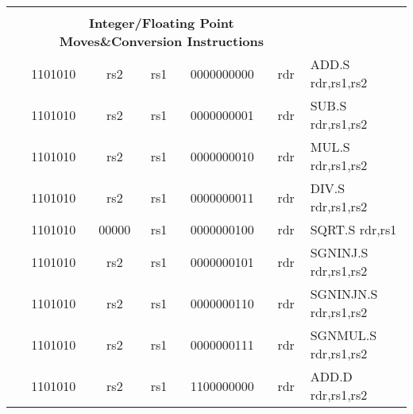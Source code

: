 \begin{table}[p]
\begin{small}
\begin{center}
\begin{tabular}{rcccccccccl}
&
\multicolumn{9}{c}{} & \\
&
\multicolumn{9}{c}{\bf Integer/Floating Point Moves\&Conversion Instructions} & \\
\cline{2-10}
  

&
\multicolumn{2}{|c|}{1101010} &
\multicolumn{1}{c|}{rs2} &
\multicolumn{1}{c|}{rs1} &
\multicolumn{4}{c|}{0000000000} &
\multicolumn{1}{c|}{rdr} & ADD.S rdr,rs1,rs2 \\
\cline{2-10}
  

&
\multicolumn{2}{|c|}{1101010} &
\multicolumn{1}{c|}{rs2} &
\multicolumn{1}{c|}{rs1} &
\multicolumn{4}{c|}{0000000001} &
\multicolumn{1}{c|}{rdr} & SUB.S rdr,rs1,rs2 \\
\cline{2-10}
  

&
\multicolumn{2}{|c|}{1101010} &
\multicolumn{1}{c|}{rs2} &
\multicolumn{1}{c|}{rs1} &
\multicolumn{4}{c|}{0000000010} &
\multicolumn{1}{c|}{rdr} & MUL.S rdr,rs1,rs2 \\
\cline{2-10}
  

&
\multicolumn{2}{|c|}{1101010} &
\multicolumn{1}{c|}{rs2} &
\multicolumn{1}{c|}{rs1} &
\multicolumn{4}{c|}{0000000011} &
\multicolumn{1}{c|}{rdr} & DIV.S rdr,rs1,rs2 \\
\cline{2-10}
  

&
\multicolumn{2}{|c|}{1101010} &
\multicolumn{1}{c|}{00000} &
\multicolumn{1}{c|}{rs1} &
\multicolumn{4}{c|}{0000000100} &
\multicolumn{1}{c|}{rdr} & SQRT.S rdr,rs1 \\
\cline{2-10}
  

&
\multicolumn{2}{|c|}{1101010} &
\multicolumn{1}{c|}{rs2} &
\multicolumn{1}{c|}{rs1} &
\multicolumn{4}{c|}{0000000101} &
\multicolumn{1}{c|}{rdr} & SGNINJ.S rdr,rs1,rs2 \\
\cline{2-10}
  

&
\multicolumn{2}{|c|}{1101010} &
\multicolumn{1}{c|}{rs2} &
\multicolumn{1}{c|}{rs1} &
\multicolumn{4}{c|}{0000000110} &
\multicolumn{1}{c|}{rdr} & SGNINJN.S rdr,rs1,rs2 \\
\cline{2-10}
  

&
\multicolumn{2}{|c|}{1101010} &
\multicolumn{1}{c|}{rs2} &
\multicolumn{1}{c|}{rs1} &
\multicolumn{4}{c|}{0000000111} &
\multicolumn{1}{c|}{rdr} & SGNMUL.S rdr,rs1,rs2 \\
\cline{2-10}
  

&
\multicolumn{2}{|c|}{1101010} &
\multicolumn{1}{c|}{rs2} &
\multicolumn{1}{c|}{rs1} &
\multicolumn{4}{c|}{1100000000} &
\multicolumn{1}{c|}{rdr} & ADD.D rdr,rs1,rs2 \\
\cline{2-10}
  


\end{tabular}
\end{center}
\end{small}
\end{table}
